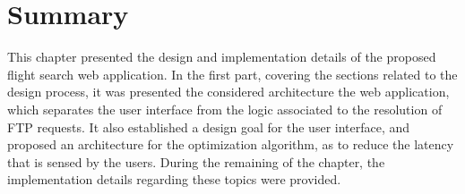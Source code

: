 \section{Summary}
\label{sec:summary_sd}

This chapter presented the design and implementation details of the proposed flight search web application. In the first part, covering the sections related to the design process, it was presented the considered architecture the web application, which separates the user interface from the logic associated to the resolution of FTP requests. It also established a design goal for the user interface, and proposed an architecture for the optimization algorithm, as to reduce the latency that is sensed by the users. During the remaining of the chapter, the implementation details regarding these topics were provided.